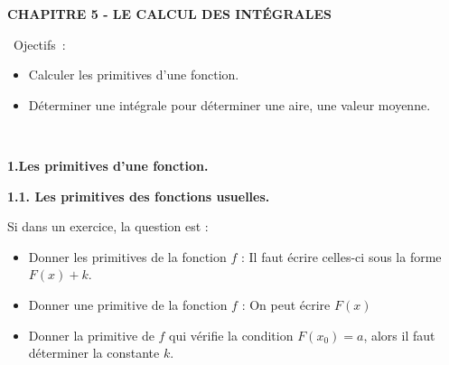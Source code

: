 \documentclass[11pt,a4paper]{article}
\newcommand{\cadre}[1]
{\begin{bclogo}[couleur = white,logo=,  arrondi = 0.3,barre=none]
		{%
			\rule{0mm}{#1mm}}\par
		\medskip
\end{bclogo}}
\begin{document}
	
	
	\begin{mybox}
		\begin{center}    
			\textbf{\LARGE CHAPITRE 5 - LE CALCUL DES INTÉGRALES}\end{center}
	\end{mybox}
	\vfill
	\begin{bclogo}[couleur = white!10,logo=\bcinfo,  arrondi = 0.1]
		{~Ojectifs~:}
		~~
		\begin{itemize}
			\item Calculer les primitives d'une fonction.
			\item Déterminer une intégrale pour déterminer une aire, une valeur moyenne.
			
			
			
		\end{itemize}
		~~
	\end{bclogo}
	
	
	\begin{mybox}
		\begin{center}
			\textbf{{1.Les primitives d'une fonction.}}    
		\end{center}
		
	\end{mybox}
	\begin{mybox}
		\begin{center}
			\textbf{{1.1. Les primitives des fonctions usuelles.}}
		\end{center}  
	\end{mybox}
	
	
	\cadre{20}
	
	
	\cadre{20}
	
	
	Si dans un exercice, la question est : 
	\begin{itemize}[label=$\bullet$]
		\item   Donner les primitives de la fonction $f$ : Il faut écrire celles-ci sous la forme $F(x)+k$.
		\item   Donner une primitive de la fonction $f$ : On peut écrire $F(x)$
		\item   Donner la primitive de $f$ qui vérifie la condition $F(x_0)=a$, alors il faut déterminer la constante $k$.
	\end{itemize}
	
\end{document}
